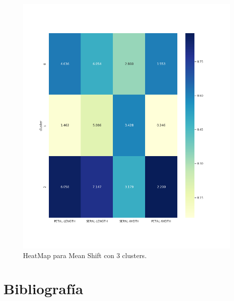 \documentclass[a4paper, 20pt]{article}
\begin{document}
\begin{figure}[h]
\centering
\includegraphics[scale=0.62]{dani/heatmapMeanShiftIRIS.png}
\caption{HeatMap para Mean Shift con 3 clusters.}
\label{hmms}
\end{figure}

\clearpage
\section{Bibliografía}
\nocite{*}


\end{document}
